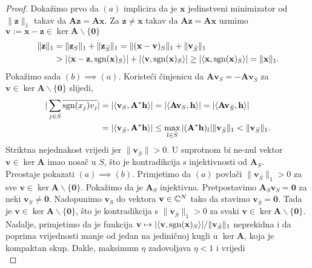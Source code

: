 \documentclass[a4paper,twoside,12pt]{memoir} %
\newcommand{\vect}[1]{\mathbf{#1}}
\renewcommand{\vec}{\vect}
\newcommand{\norm}[1]{\|{#1}\|}
\newcommand{\sgn}{\text{\normalfont{sgn}}}
\begin{document}
\begin{proof}
    Doka\v{z}imo prvo da $(a)$ implicira da je $\vec x$ jedinstveni minimizator od $\norm{\vec z}_1$ takav da $\vec{Az} = \vec{Ax}$. Za $\vec z \neq \vec x$ takav da $\vec{Az} = \vec {Ax}$ uzmimo $\vec v := \vec x - \vec z \in \ker \vec A \backslash \{\vec 0\}$
    \begin{align*}
        \norm{\vec z}_1 &= \norm{\vec z_S}_1 + \norm{\vec z_{\bar S} }_1 = \norm{(\vec x - \vec v)_S}_1 + \norm{\vec v_{\bar S}}_1  \\
        &> |\langle \vec x - \vec z, \sgn(\vec x)_S \rangle | + |\langle \vec v, \sgn(\vec x)_S \rangle| \geq |\langle \vec x, \sgn(\vec x)_S  \rangle| = \norm{\vec x}_1.
    \end{align*}
    \indent Poka\v{z}imo sada $(b)\implies(a)$. Koriste\'ci \v{c}injenicu da $\vec{Av}_S = - \vec {Av}_{\bar S}$ za $\vec v \in \ker \vec A \backslash \{\vec 0\}$ slijedi,
    \begin{align*}
        |\sum_{j \in S} \overline{\sgn(x_j)v_j}| &= |\langle \vec v_S, \vec A^* \vec h \rangle|  = |\langle \vec{Av}_S, \vec h \rangle| = |\langle \vec{Av}_{\bar S}, \vec h\rangle| \\ 
        &= |\langle \vec v_{\bar S}, \vec{A}^*\vec h \rangle| \leq \max_{l \in \bar S} |(\vec A^* \vec h)_l| \norm{\vec v_{\bar S}}_1 < \norm{\vec v_{\bar S}}_1.
    \end{align*}
    Striktna nejednakost vrijedi jer $\norm{\vec v_{\bar S}} > 0$. U suprotnom bi ne-nul vektor $\vec v \in \ker \vec A$ imao nosa\v{c} u $S$, \v{s}to je kontradikcija s injektivnosti od $\vec A_S$.\\
    \indent Preostaje pokazati $(a) \implies (b)$. Primjetimo da $(a)$ povla\v{c}i $\norm{\vec v_{\bar S}}_1 > 0$ za sve $\vec v \in \ker \vec A \backslash \{\vec 0\}$. Poka\v{z}imo da je $\vec A_S$ injektivna. Pretpostavimo $\vec A_S \vec v_S = \vec 0$ za neki $\vec v_S \neq \vec 0$. Nadopunimo $\vec v_S$ do vektora $\vec v \in \C^N$ tako da stavimo $\vec v_{\bar S} = \vec 0$. Tada je $\vec v \in \ker \vec A \backslash \{\vec 0\}$, \v{s}to je kontradikcija s $\norm{\vec v_{\bar S}}_1 > 0$ za svaki $\vec v \in \ker \vec A \backslash \{\vec 0\}$. Nadalje, primjetimo da je funkcija $\vec v \mapsto |\langle \vec v, \sgn(\vec x)_S \rangle|/ \norm{\vec v_{\bar S}}_1$ neprekidna i da poprima vrijednosti manje od jedan na jedini\v{c}noj kugli u $\ker \vec A$, koja je kompaktan skup. Dakle, maksimum $\eta$ zadovoljava $\eta < 1$ i vrijedi 
    \begin{equation*}

\end{equation*}
\end{proof}
\end{document}
